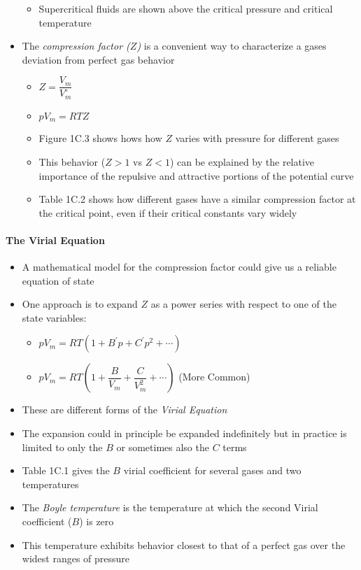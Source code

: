 \documentclass[12pt, openany, letterpaper]{memoir}
\begin{document}
\begin{itemize}
\begin{itemize}
		      \item Supercritical fluids are shown above the critical pressure and critical temperature
	      \end{itemize}
	\item The \emph{compression factor ($Z$)} is a convenient way to characterize a gases deviation from perfect gas behavior
	      \begin{itemize}
		      \item $Z=\dfrac{V_m}{V_m^\circ}$
		      \item $pV_m = RTZ$
		      \item Figure 1C.3 shows hows how $Z$ varies with pressure for different gases
		      \item This behavior ($Z>1$ vs $Z<1$) can be explained by the relative importance of the repulsive and attractive portions of the potential curve
		      \item Table 1C.2 shows how different gases have a similar compression factor at the critical point, even if their critical constants vary widely
	      \end{itemize}
\end{itemize}
\paragraph{The Virial Equation}
\begin{itemize}
	\item A mathematical model for the compression factor could give us a reliable equation of state
	\item One approach is to expand $Z$ as a power series with respect to one of the state variables:
	      \begin{itemize}
		      \item $pV_m = RT\left(1+B^\prime p + C^\prime p^2 + \cdots\right)$
		      \item $pV_m = RT\left(1+\dfrac{B}{V_m} + \dfrac{C}{V_m^2}+\cdots\right)$ (More Common)
	      \end{itemize}
	\item These are different forms of the \emph{Virial Equation}
	\item The expansion could in principle be expanded indefinitely but in practice is limited to only the $B$ or sometimes also the $C$ terms
	\item Table 1C.1 gives the $B$ virial coefficient for several gases and two temperatures
	\item The \emph{Boyle temperature} is the temperature at which the second Virial coefficient ($B$) is zero
	\item This temperature exhibits behavior closest to that of a perfect gas over the widest ranges of pressure
\end{itemize}
\end{document}
